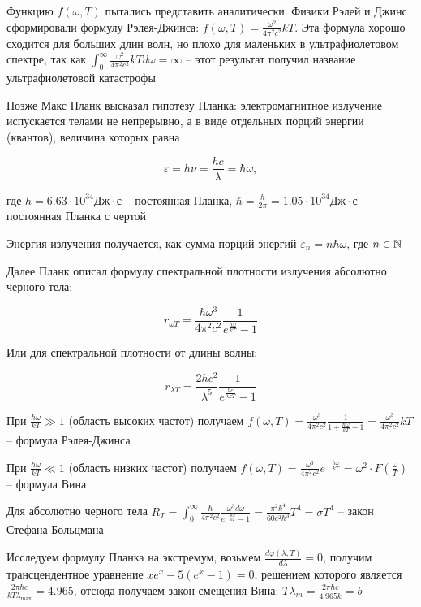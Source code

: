 \documentclass[12pt]{article}
\begin{document}
Функцию $f(\omega, T)$ пытались представить аналитически. Физики Рэлей и Джинс сформировали формулу Рэлея-Джинса: $f(\omega, T) = \frac{\omega^2}{4\pi^2 c^2} kT$. Эта формула хорошо сходится для больших длин волн, но плохо для маленьких в ультрафиолетовом спектре, так как $\int_0^\infty \frac{\omega^2}{4\pi^2 c^2} kT d\omega = \infty$ -- этот результат получил название ультрафиолетовой катастрофы

Позже Макс Планк высказал гипотезу Планка: электромагнитное излучение испускается телами не непрерывно, а в виде отдельных порций энергии (квантов), величина которых равна 

\[\varepsilon = h \nu = \frac{h c}{\lambda} = \hbar \omega,\]

где $h = 6.63 \cdot 10^{34} \text{Дж}\cdot\text{с}$ -- постоянная Планка, $\hbar = \frac{h}{2\pi} = 1.05 \cdot 10^{34} \text{Дж}\cdot\text{с}$ -- постоянная Планка с чертой

Энергия излучения получается, как сумма порций энергий $\varepsilon_n = n \hbar \omega$, где $n \in \mathbb{N}$

Далее Планк описал формулу спектральной плотности излучения абсолютно черного тела:

\[r_{\omega T} = \frac{\hbar \omega^3}{4 \pi^2 c^2} \frac{1}{e^{\frac{\hbar \omega}{kT}} - 1}\]

Или для спектральной плотности от длины волны:

\[r_{\lambda T} = \frac{2 h c^2}{\lambda^5} \frac{1}{e^{\frac{hc}{\lambda kT}} - 1}\]

При $\frac{\hbar \omega}{kT} \gg 1$ (область высоких частот) получаем $f(\omega, T) = \frac{\omega^3}{4\pi^2 c^2} \frac{1}{1 + \frac{\hbar \omega}{kT} - 1} = \frac{\omega^3}{4\pi^2 c^2} kT$ -- формула Рэлея-Джинса

При $\frac{\hbar \omega}{kT} \ll 1$ (область низких частот) получаем $f(\omega, T) = \frac{\omega^3}{4\pi^2 c^2} e^{-\frac{\hbar \omega}{k T}} = \omega^2 \cdot F\left(\frac{\omega}{T}\right)$ -- формула Вина

Для абсолютно черного тела $R_T = \int_0^\infty \frac{\hbar}{4\pi^2 c^2} \frac{\omega^3 d\omega}{e^{-\frac{\hbar \omega}{k T}} - 1} = \frac{\pi^2 k^4}{60 c^2 \hbar^3} T^4 = \sigma T^4$ -- закон Стефана-Больцмана

\smallvspace 

Исследуем формулу Планка на экстремум, возьмем $\frac{d \varphi(\lambda, T)}{d\lambda} = 0$, получим трансцендентное уравнение $x e^x - 5(e^x - 1) = 0$, решением которого является $\frac{2\pi \hbar c}{k T \lambda_{\max}} = 4.965$, отсюда получаем закон смещения Вина: $T \lambda_m = \frac{2\pi \hbar c}{4.965 k} = b$
\end{document}
